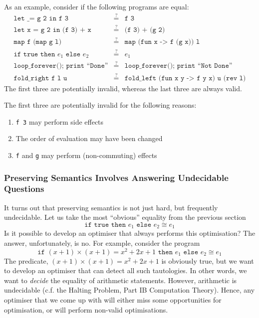\newcommand{\questioneq}{\overset{?}{=}}
As an example, consider if the following programs are equal:
\[\begin{array}{rcl}
    \texttt{let \_ = g 2 in f 3} & \questioneq & \texttt{f 3} \\
    \texttt{let x = g 2 in (f 3) + x} & \questioneq & \texttt{(f 3) + (g 2)} \\
    \texttt{map f (map g l)} & \questioneq & \texttt{map (fun x -> f (g x)) l} \\
    \texttt{if true then $e_1$ else $e_2$} & \questioneq & e_1 \\
    \texttt{loop\_forever(); print ``Done''} & \questioneq & \texttt{loop\_forever(); print ``Not Done''} \\
    \texttt{fold\_right f l u} & \questioneq & \texttt{fold\_left (fun x y -> f y x) u (rev l)}
\end{array}\]
The first three are potentially invalid, whereas the last three are always valid. 

The first three are potentially invalid for the following reasons:
\begin{enumerate}
    \item \texttt{f 3} may perform side effects
    \item The order of evaluation may have been changed
    \item \texttt{f} and \texttt{g} may perform (non-commuting) effects
\end{enumerate}

\subsubsection{Preserving Semantics Involves Answering Undecidable Questions\optional}
It turns out that preserving semantics is not just hard, but frequently undecidable. Let us take the most ``obvious'' equality from the previous section
\[\texttt{if true then $e_1$ else $e_2$} \cong e_1 \]
Is it possible to develop an optimiser that always performs this optimisation? The answer, unfortunately, is no. For example, consider the program
\[\texttt{if $(x+1)\times(x+1) = x^2 + 2x + 1$ then $e_1$ else $e_2$} \cong e_1 \]
The predicate, $(x+1)\times(x+1) = x^2 + 2x + 1$ is obviously true, but we want to develop an optimiser that can detect all such tautologies. In other words, we want to \textit{decide} the equality of arithmetic statements. However, arithmetic is undecidable (c.f. the Halting Problem, \textsf{Part IB Computation Theory}). Hence, any optimiser that we come up with will either miss some opportunities for optimisation, or will perform non-valid optimisations.

